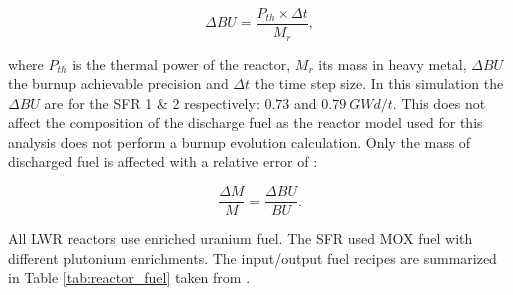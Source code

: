 \documentclass[12pt]{article}
\begin{document}
\begin{equation}
  \Delta BU = \frac{P_{th} \times \Delta t}{M_{r}},
\end{equation}

\noindent where $P_{th}$ is the thermal power of the reactor, $M_{r}$ its mass
in heavy metal, $\Delta BU$ the burnup achievable precision and $\Delta t$ the
time step size.  In this simulation the $\Delta BU$ are for the SFR 1 \& 2
respectively: $0.73$ and $0.79~GWd/t$.  This does not affect the composition
of the discharge fuel as the reactor model used for this analysis does not
perform a burnup evolution calculation.  Only the mass of discharged fuel is
affected with a relative error of :

\begin{equation}
  \frac{\Delta M}{M} = \frac{\Delta BU}{BU}.
\end{equation}


All LWR reactors use enriched uranium fuel. The SFR used MOX fuel with
different plutonium enrichments. The input/output fuel recipes are summarized
in Table \ref{tab:reactor_fuel} taken from \cite{B.Feng_calculation}.
\end{document}
